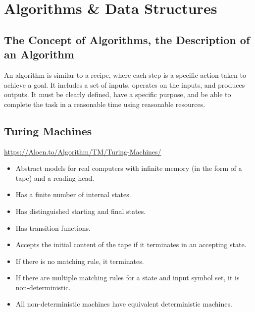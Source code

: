 \documentclass[11pt,journal,compsoc]{IEEEtran}
\begin{document}
\section{Algorithms \& Data Structures}


\subsection{The Concept of Algorithms, the Description of an Algorithm}

An algorithm is similar to a recipe, where each step is a specific action taken to achieve a goal. It includes a set of inputs, operates on the inputs, and produces outputs. It must be clearly defined, have a specific purpose, and be able to complete the task in a reasonable time using reasonable resources.


\subsection{Turing Machines}

\url{https://Aloen.to/Algorithm/TM/Turing-Machines/}

\begin{itemize}
    \item Abstract models for real computers with infinite memory (in the form of a tape) and a reading head.
    
    \item Has a finite number of internal states.
    
    \item Has distinguished starting and final states.
    
    \item Has transition functions.
\end{itemize}

\begin{itemize}
    \item Accepts the initial content of the tape if it terminates in an accepting state.
    
    \item If there is no matching rule, it terminates.
    
    \item If there are multiple matching rules for a state and input symbol set, it is non-deterministic.
    
    \item All non-deterministic machines have equivalent deterministic machines.
\end{itemize}
\end{document}
